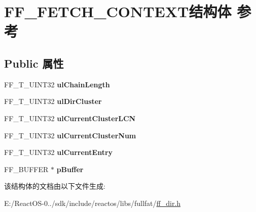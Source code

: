 \hypertarget{struct_f_f___f_e_t_c_h___c_o_n_t_e_x_t}{}\section{F\+F\+\_\+\+F\+E\+T\+C\+H\+\_\+\+C\+O\+N\+T\+E\+X\+T结构体 参考}
\label{struct_f_f___f_e_t_c_h___c_o_n_t_e_x_t}
\subsection*{Public 属性}
\begin{DoxyCompactItemize}
\item 
\mbox{\label{struct_f_f___f_e_t_c_h___c_o_n_t_e_x_t_a11e723cc1795d83926dbc4b88c598fef}} 
F\+F\+\_\+\+T\+\_\+\+U\+I\+N\+T32 {\bfseries ul\+Chain\+Length}
\item 
\mbox{\label{struct_f_f___f_e_t_c_h___c_o_n_t_e_x_t_a28430a7b308e91a31196bd21beb2c2f2}} 
F\+F\+\_\+\+T\+\_\+\+U\+I\+N\+T32 {\bfseries ul\+Dir\+Cluster}
\item 
\mbox{\label{struct_f_f___f_e_t_c_h___c_o_n_t_e_x_t_ae3ffc130390e481db8516928a91c73e1}} 
F\+F\+\_\+\+T\+\_\+\+U\+I\+N\+T32 {\bfseries ul\+Current\+Cluster\+L\+CN}
\item 
\mbox{\label{struct_f_f___f_e_t_c_h___c_o_n_t_e_x_t_ae2690430057cf51e9c58466e58b73a50}} 
F\+F\+\_\+\+T\+\_\+\+U\+I\+N\+T32 {\bfseries ul\+Current\+Cluster\+Num}
\item 
\mbox{\label{struct_f_f___f_e_t_c_h___c_o_n_t_e_x_t_a3dc43aeb9d03d1859ab3ce2c68200b00}} 
F\+F\+\_\+\+T\+\_\+\+U\+I\+N\+T32 {\bfseries ul\+Current\+Entry}
\item 
\mbox{\label{struct_f_f___f_e_t_c_h___c_o_n_t_e_x_t_a86d77dcfbd614ffe0356aa9b9890c89f}} 
F\+F\+\_\+\+B\+U\+F\+F\+ER $\ast$ {\bfseries p\+Buffer}
\end{DoxyCompactItemize}


该结构体的文档由以下文件生成\+:\begin{DoxyCompactItemize}
\item 
E\+:/\+React\+O\+S-\/0../sdk/include/reactos/libs/fullfat/\hyperlink{ff__dir_8h}{ff\+\_\+dir.\+h}\end{DoxyCompactItemize}
